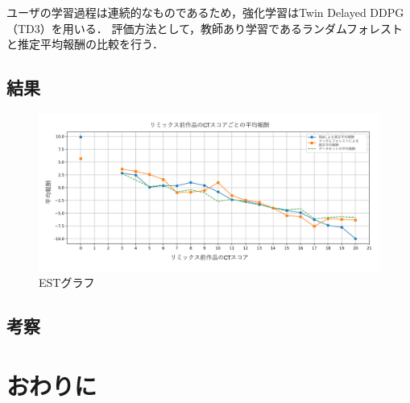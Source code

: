 \documentclass[submit,techrep,noauthor]{ipsj}
\begin{document}
ユーザの学習過程は連続的なものであるため，強化学習はTwin Delayed DDPG（TD3）を用いる．
評価方法として，教師あり学習であるランダムフォレストと推定平均報酬の比較を行う．



\subsection{結果}

\begin{figure}[t]
  \centering
  \includegraphics[width=\textwidth]{@IPSJ_SIGSE202511_Horio/estgraph.pdf}
  \caption{ESTグラフ}
  \label{estgraph}
\end{figure}

\subsection{考察}

\section{おわりに}



\end{document}
